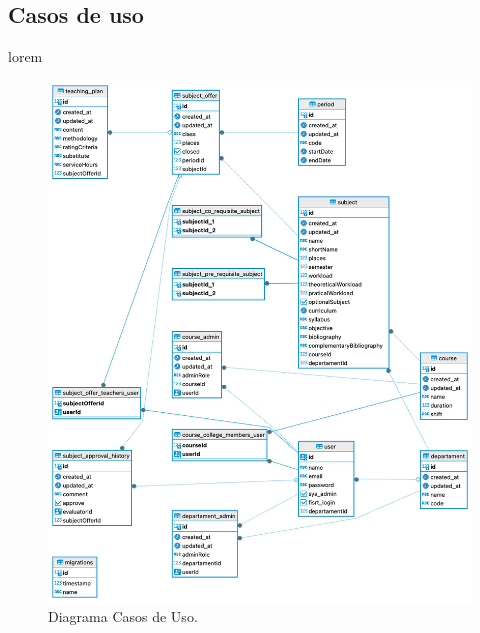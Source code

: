 \newpage
\subsection{Casos de uso}\label{subsec:casosdeuso}

lorem


\begin{figure}[h]
    \centering
    \includegraphics[width=450px]{imgs/model_db.png}
    \caption{Diagrama Casos de Uso.}
    \label{fig:Figura1}
\end{figure}